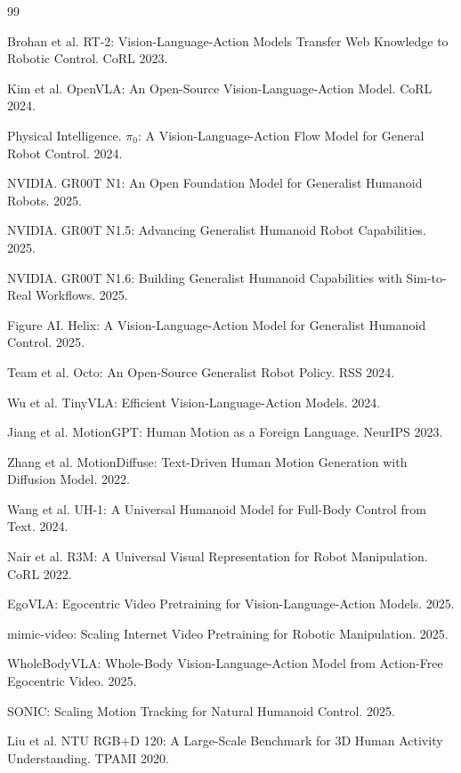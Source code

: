 \documentclass[letterpaper, 10pt, conference]{ieeeconf}
\begin{document}
\begin{thebibliography}{99}

Brohan et al. RT-2: Vision-Language-Action Models Transfer Web Knowledge to Robotic Control. CoRL 2023.

Kim et al. OpenVLA: An Open-Source Vision-Language-Action Model. CoRL 2024.

Physical Intelligence. $\pi_0$: A Vision-Language-Action Flow Model for General Robot Control. 2024.

NVIDIA. GR00T N1: An Open Foundation Model for Generalist Humanoid Robots. 2025.

NVIDIA. GR00T N1.5: Advancing Generalist Humanoid Robot Capabilities. 2025.

NVIDIA. GR00T N1.6: Building Generalist Humanoid Capabilities with Sim-to-Real Workflows. 2025.

Figure AI. Helix: A Vision-Language-Action Model for Generalist Humanoid Control. 2025.

Team et al. Octo: An Open-Source Generalist Robot Policy. RSS 2024.

Wu et al. TinyVLA: Efficient Vision-Language-Action Models. 2024.

Jiang et al. MotionGPT: Human Motion as a Foreign Language. NeurIPS 2023.

Zhang et al. MotionDiffuse: Text-Driven Human Motion Generation with Diffusion Model. 2022.

Wang et al. UH-1: A Universal Humanoid Model for Full-Body Control from Text. 2024.

Nair et al. R3M: A Universal Visual Representation for Robot Manipulation. CoRL 2022.

EgoVLA: Egocentric Video Pretraining for Vision-Language-Action Models. 2025.

mimic-video: Scaling Internet Video Pretraining for Robotic Manipulation. 2025.

WholeBodyVLA: Whole-Body Vision-Language-Action Model from Action-Free Egocentric Video. 2025.

SONIC: Scaling Motion Tracking for Natural Humanoid Control. 2025.

Liu et al. NTU RGB+D 120: A Large-Scale Benchmark for 3D Human Activity Understanding. TPAMI 2020.


\end{thebibliography}
\end{document}
